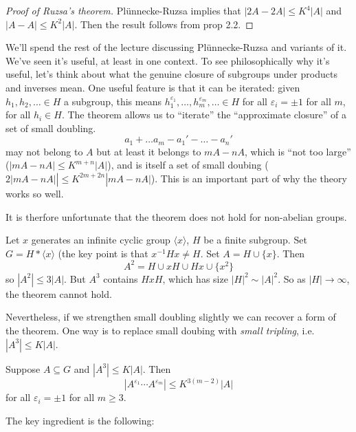 \documentclass[a4paper]{article}
\begin{document}
\begin{proof}[Proof of Ruzsa's theorem]
  Plünnecke-Ruzsa implies that \(|2A - 2A| \leq K^4 |A|\) and \(|A - A| \leq K^2 |A|\). Then the result follows from prop 2.2.
\end{proof}

We'll spend the rest of the lecture discussing Plünnecke-Ruzsa and variants of it.
We've seen it's useful, at least in one context. To see philosophically why it's useful, let's think about what the genuine closure of subgroups under products and inverses mean. One useful feature is that it can be iterated: given \(h_1, h_2, \dots \in H\) a subgroup, this means \(h_1^{\varepsilon_1}, \dots, h_m^{\varepsilon_m}, \dots \in H\) for all \(\varepsilon_i = \pm 1\) for all \(m\), for all \(h_i \in H\). The theorem allows us to ``iterate'' the ``approximate closure'' of a set of small doubling.
\[
  a_1 + \dots a_m - a_1' - \dots - a_n'
\]
may not belong to \(A\) but at least it belongs to \(mA - nA\), which is ``not too large'' (\(|mA - nA| \leq K^{m + n} |A|\)), and is itself a set of small doubing (\(2|mA - nA|| \leq K^{2m + 2n} |mA - nA|\)). This is an important part of why the theory works so well.

It is therfore unfortunate that the theorem does not hold for non-abelian groups.

\begin{eg}
  Let \(x\) generates an infinite cyclic group \(\langle x \rangle\), \(H\) be a finite subgroup. Set \(G = H * \langle x \rangle\) (the key point is that \(x^{-1}Hx \neq H\). Set \(A = H \cup \{x\}\). Then
  \[
    A^2 = H \cup xH \cup Hx \cup \{x^2\}
  \]
  so \(|A^2| \leq 3 |A|\). But \(A^3\) contains \(HxH\), which has size \(|H|^2 \sim |A|^2\). So as \(|H| \to \infty\), the theorem cannot hold.
\end{eg}

Nevertheless, if we strengthen small doubling slightly we can recover a form of the theorem. One way is to replace small doubing with \emph{small tripling}, i.e.\ \(|A^3| \leq K |A|\).

\begin{proposition}[2.7]
  Suppose \(A \subseteq G\) and \(|A^3| \leq K |A|\). Then
  \[
    |A^{\varepsilon_1} \cdots A^{\varepsilon_m}| \leq K^{3(m - 2)} |A|
  \]
  for all \(\varepsilon_i = \pm 1\) for all \(m \geq 3\).
\end{proposition}

The key ingredient is the following:
\end{document}
